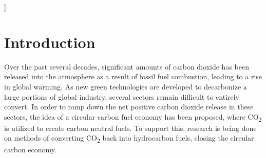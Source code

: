 \documentclass[twoside,twocolumn,9pt]{article}
\begin{document}
  ]

\renewcommand*\rmdefault{bch}\normalfont\upshape
\rmfamily
\section*{}
\vspace{-1cm}






\section{Introduction}

Over the past several decades, significant amounts of carbon dioxide has been released into the atmosphere as a result of fossil fuel combustion, leading to a rise in global warming\cite{hansen_target_2008, choi_research_2008}. As new green technologies are developed to decarbonize a large portions of global industry, several sectors remain difficult to entirely convert\cite{welsby_unextractable_2021}. In order to ramp down the net positive carbon dioxide release in these sectors, the idea of a circular carbon fuel economy\cite{kirchherr_conceptualizing_2017} has been proposed, where CO\textsubscript{2} is utilized to create carbon neutral fuels. To support this, research is being done on methods of converting CO\textsubscript{2} back into hydrocarbon fuels, closing the circular carbon economy\cite{roy_toward_2010}.
\end{document}
